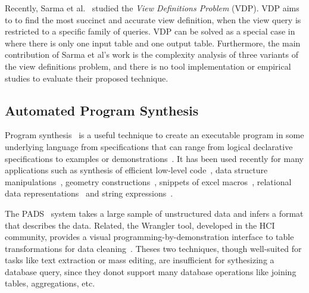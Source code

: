 Recently, Sarma et al.~\cite{DasSarma:2010} studied the \textit{View Definitions Problem} (VDP).
VDP aims to to find the most
succinct and accurate view definition, when
the view query is restricted to a specific family of queries.
VDP can be solved as a special case in \ourtool where there is only one
input table and one output table. Furthermore, the main contribution
of Sarma et al's work is the complexity analysis of
three variants of the view definitions problem, and there is no
tool implementation or empirical studies to evaluate
their proposed technique.





\subsection{Automated Program Synthesis }


Program synthesis~\cite{Gulwani:2010:DPS} is a useful
technique to create an executable program
in some underlying language from specifications that can range
from logical declarative specifications to examples or
demonstrations~\cite{Harris:2011, singh:2012, Gulwani:2011,
Kandel:2011, Fisher08Pads,Lau:2003:PDU, Lau:2000:VSA, Barbosa:2010:MLA, Arasu:2009:LST}.
It has been used recently for many applications
such as synthesis of efficient low-level code~\cite{Solar-Lezama:2005},
data structure manipulations~\cite{Fisher:2008},
geometry constructions~\cite{Gulwani:2011:SGC},
snippets of excel macros~\cite{Harris:2011},
relational data representations~\cite{Barbosa:2010:MLA, Arasu:2009:LST} and string
expressions~\cite{singh:2012, Gulwani:2011}.


The PADS~\cite{Fisher:2008} system takes a large sample
of unstructured data and infers a
format that describes the data. Related,
the Wrangler tool, developed in the HCI community,
provides a visual programming-by-demonstration
interface to table transformations for data cleaning~\cite{Kandel:2011}.
Theses two techniques, though well-suited for tasks
like text extraction or mass editing, are insufficient for
sythesizing a database query, since they donot support
many database operations like joining
tables, aggregations, etc.


